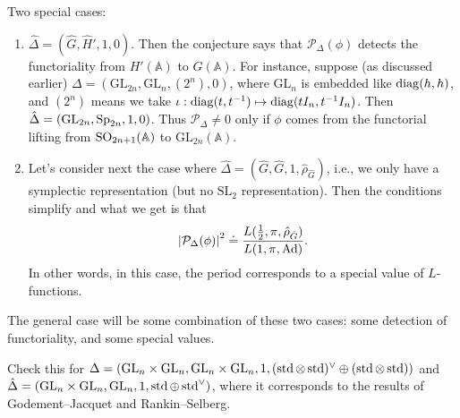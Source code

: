 \documentclass[reqno]{amsart} 
\numberwithin{theorem}{section}
\numberwithin{equation}{section}
\numberwithin{exercise}{section}
\begin{document}
Two special cases:
\begin{enumerate}
\item\label{enumerate:cq6txwuycw} $\hat{\Delta} =(\hat{G}, \hat{H}', 1, 0)$.  Then the conjecture says that $\mathcal{P}_\Delta(\phi)$ detects the functoriality from $H'(\mathbb{A})$ to $G(\mathbb{A})$.  For instance, suppose (as discussed earlier) $\Delta =(\mathrm{GL}_{2 n}, \mathrm{GL}_n,(2^n), 0)$, where $\mathrm{GL}_n$ is embedded like $\operatorname{diag}(h, h)$, and $(2^n)$ means we take $\iota : \operatorname{diag}(t, t^{-1}) \mapsto \operatorname{diag}(t I_n, t^{-1} I_n)$.  Then $\hat{\Delta} =(\mathrm{GL}_{2 n}, \operatorname{Sp}_{2 n}, 1, 0)$.  Thus $\mathcal{P}_\Delta \neq 0$ only if $\phi$ comes from the functorial lifting from $\operatorname{SO}_{2 n + 1}(\mathbb{A})$ to $\mathrm{GL}_{2 n}(\mathbb{A})$.
\item\label{enumerate:cq6txwu9pz} Let's consider next the case where $\hat{\Delta} =(\hat{G}, \hat{G}, 1, \hat{\rho}_{\hat{G}})$, i.e., we only have a symplectic representation (but no $\mathrm{SL}_2$ representation).  Then the conditions simplify and what we get is that
  \begin{equation*}
    \left\lvert \mathcal{P}_\Delta(\phi) \right\rvert^2 \doteq \frac{L(\tfrac{1}{2}, \pi, \hat{\rho}_{\hat{G}})}{L(1, \pi, \operatorname{Ad})}.
  \end{equation*}
  In other words, in this case, the period corresponds to a special value of $L$-functions.
\end{enumerate}
The general case will be some combination of these two cases: some detection of functoriality, and some special values.

\begin{exercise}\label{exercise:cq6txvu33z}
  Check this for $\Delta =(\mathrm{GL}_n \times \mathrm{GL}_n, \mathrm{GL}_n \times \mathrm{GL}_n, 1,(\operatorname{std} \otimes \operatorname{std})^\vee \oplus(\operatorname{std} \otimes \operatorname{std}))$ and $\hat{\Delta} =(\mathrm{GL}_n \times \mathrm{GL}_n, \mathrm{GL}_n, 1, \operatorname{std} \oplus \operatorname{std}^\vee)$, where it corresponds to the results of Godement--Jacquet and Rankin--Selberg.
\end{exercise}
\end{document}
